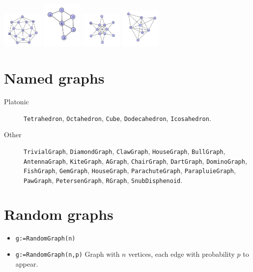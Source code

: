\documentclass[11pt]{article}
\begin{document}
\begin{multicols}{3}
\begin{itemize}
\includegraphics[width=2cm]{wheel.png} \includegraphics[width=2cm]{fan.png} \includegraphics[width=2cm]{sun.png} \includegraphics[width=2cm]{spiky.png}
\end{itemize}

\section{Named graphs}
\label{sec:org3df8d9d}
\begin{description}
\item[{Platonic}] \texttt{Tetrahedron}, \texttt{Octahedron}, \texttt{Cube}, \texttt{Dodecahedron}, \texttt{Icosahedron}.
\item[{Other}] \texttt{TrivialGraph}, \texttt{DiamondGraph}, \texttt{ClawGraph},
\texttt{HouseGraph}, \texttt{BullGraph}, \texttt{AntennaGraph}, \texttt{KiteGraph},
\texttt{AGraph}, \texttt{ChairGraph}, \texttt{DartGraph}, \texttt{DominoGraph},
\texttt{FishGraph}, \texttt{GemGraph}, \texttt{HouseGraph}, \texttt{ParachuteGraph},
\texttt{ParapluieGraph}, \texttt{PawGraph}, \texttt{PetersenGraph}, \texttt{RGraph},
\texttt{SnubDisphenoid}.
\end{description}
\section{Random graphs}
\label{sec:orgdfd8b7a}

\begin{itemize}
\item \texttt{g:=RandomGraph(n)}
\item \texttt{g:=RandomGraph(n,p)} Graph with \(n\) vertices, each edge with
probability \(p\) to appear.
\end{itemize}


\end{multicols}
\end{document}
